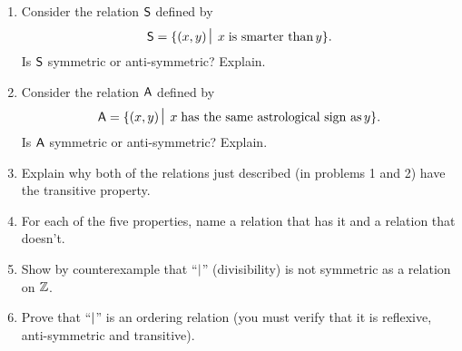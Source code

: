 \begin{enumerate}
\item Consider the relation $\mbox{\textsf S}$ defined by 
\[ \relS = \{ (x,y) \suchthat \; x \; \mbox{is smarter than} \, y \}. \]
\noindent Is $\mbox{\textsf S}$ symmetric or anti-symmetric?  Explain.

\wbvfill

\item Consider the relation $\mbox{\textsf A}$ defined by 
\[ \relA = \{ (x,y) \suchthat \; x \; \mbox{has the same astrological sign as} \, y \}. \]
\noindent Is $\mbox{\textsf A}$ symmetric or anti-symmetric?  Explain.

\wbvfill

\item Explain why both of the relations just described (in problems 1 and 2)
have the transitive property.

\wbvfill

\item For each of the five properties, name a relation that has it
and a relation that doesn't.

\wbvfill

\rule{0pt}{0pt}

\wbvfill

\workbookpagebreak

\item Show by counterexample that ``$\,\!\mid\!\,$'' (divisibility) is not symmetric as a relation on ${\mathbb Z}$.

 \wbvfill
 
 \item Prove that ``$\,\!\mid\!\,$'' is an ordering relation (you must verify that it is reflexive, anti-symmetric and transitive).

 \wbvfill

\rule{0pt}{0pt}

\end{enumerate} 

